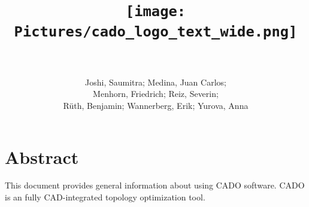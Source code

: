 \documentclass[
12pt, %
a4paper, %
oneside, %
headinclude,footinclude, %
BCOR5mm, %
]{scrartcl}
\title{\texttt{[image: Pictures/cado\_logo\_text\_wide.png]} \\ \normalfont\spacedallcaps{User Guide} \\
\vspace*{\fill}}%
\author{Joshi, Saumitra; Medina, Juan Carlos; \\ Menhorn, Friedrich; Reiz, Severin;\\ R{\"u}th, Benjamin;  Wannerberg, Erik; Yurova, Anna}%
\begin{document}
\newcommand{\titlebox}[2]{
\begin{tikzpicture}
\node[draw,thick,inner sep=6mm] (titlebox) {#2};
\node[fill=white] (Title) at (titlebox.north) {\bfseries \large #1};
\end{tikzpicture}
}
\renewcommand{\sectionmark}[1]{\markright{\spacedlowsmallcaps{#1}}} %

\newcommand{\titledframe}[2]{%
       \boxput*(0,1){\psframebox*{#1}}%
         {\psframebox[framesep=12pt]{#2}}}
         
\pagestyle{scrheadings} %



\maketitle %

\setcounter{tocdepth}{2} %
\newpage
\tableofcontents %




\section*{Abstract} %
This document provides general information about using CADO software. CADO is an fully CAD-integrated topology optimization tool.
\end{document}
